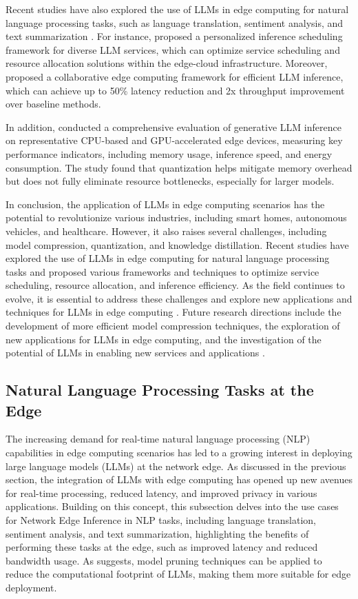 \documentclass[11pt,a4paper]{article}
\begin{document}
Recent studies have also explored the use of LLMs in edge computing for natural language processing tasks, such as language translation, sentiment analysis, and text summarization \cite{arxiv:2402.06196}. For instance, \cite{arxiv:2405.14636} proposed a personalized inference scheduling framework for diverse LLM services, which can optimize service scheduling and resource allocation solutions within the edge-cloud infrastructure. Moreover, \cite{arxiv:2405.14371} proposed a collaborative edge computing framework for efficient LLM inference, which can achieve up to 50\% latency reduction and 2x throughput improvement over baseline methods.

In addition, \cite{doi:10.1145/3788870} conducted a comprehensive evaluation of generative LLM inference on representative CPU-based and GPU-accelerated edge devices, measuring key performance indicators, including memory usage, inference speed, and energy consumption. The study found that quantization helps mitigate memory overhead but does not fully eliminate resource bottlenecks, especially for larger models.

In conclusion, the application of LLMs in edge computing scenarios has the potential to revolutionize various industries, including smart homes, autonomous vehicles, and healthcare. However, it also raises several challenges, including model compression, quantization, and knowledge distillation. Recent studies have explored the use of LLMs in edge computing for natural language processing tasks and proposed various frameworks and techniques to optimize service scheduling, resource allocation, and inference efficiency. As the field continues to evolve, it is essential to address these challenges and explore new applications and techniques for LLMs in edge computing \cite{arxiv:2409.00088}. Future research directions include the development of more efficient model compression techniques, the exploration of new applications for LLMs in edge computing, and the investigation of the potential of LLMs in enabling new services and applications \cite{doi:10.1007/s42452-025-07668-w}.


\subsection{Natural Language Processing Tasks at the Edge}


The increasing demand for real-time natural language processing (NLP) capabilities in edge computing scenarios has led to a growing interest in deploying large language models (LLMs) at the network edge. As discussed in the previous section, the integration of LLMs with edge computing has opened up new avenues for real-time processing, reduced latency, and improved privacy in various applications. Building on this concept, this subsection delves into the use cases for Network Edge Inference in NLP tasks, including language translation, sentiment analysis, and text summarization, highlighting the benefits of performing these tasks at the edge, such as improved latency and reduced bandwidth usage. As \cite{doi:10.18653/v1/d18-1153} suggests, model pruning techniques can be applied to reduce the computational footprint of LLMs, making them more suitable for edge deployment.
\end{document}
